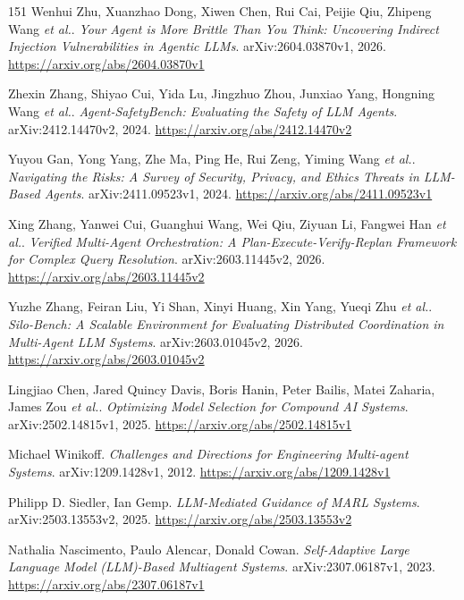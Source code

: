 \documentclass[11pt,a4paper]{article}
\begin{document}
\begin{thebibliography}{151}
Wenhui Zhu, Xuanzhao Dong, Xiwen Chen, Rui Cai, Peijie Qiu, Zhipeng Wang \emph{et al.}.
\newblock \emph{Your Agent is More Brittle Than You Think: Uncovering Indirect Injection Vulnerabilities in Agentic LLMs}.
\newblock arXiv:2604.03870v1, 2026.
\newblock \url{https://arxiv.org/abs/2604.03870v1}

Zhexin Zhang, Shiyao Cui, Yida Lu, Jingzhuo Zhou, Junxiao Yang, Hongning Wang \emph{et al.}.
\newblock \emph{Agent-SafetyBench: Evaluating the Safety of LLM Agents}.
\newblock arXiv:2412.14470v2, 2024.
\newblock \url{https://arxiv.org/abs/2412.14470v2}

Yuyou Gan, Yong Yang, Zhe Ma, Ping He, Rui Zeng, Yiming Wang \emph{et al.}.
\newblock \emph{Navigating the Risks: A Survey of Security, Privacy, and Ethics Threats in LLM-Based Agents}.
\newblock arXiv:2411.09523v1, 2024.
\newblock \url{https://arxiv.org/abs/2411.09523v1}

Xing Zhang, Yanwei Cui, Guanghui Wang, Wei Qiu, Ziyuan Li, Fangwei Han \emph{et al.}.
\newblock \emph{Verified Multi-Agent Orchestration: A Plan-Execute-Verify-Replan Framework for Complex Query Resolution}.
\newblock arXiv:2603.11445v2, 2026.
\newblock \url{https://arxiv.org/abs/2603.11445v2}

Yuzhe Zhang, Feiran Liu, Yi Shan, Xinyi Huang, Xin Yang, Yueqi Zhu \emph{et al.}.
\newblock \emph{Silo-Bench: A Scalable Environment for Evaluating Distributed Coordination in Multi-Agent LLM Systems}.
\newblock arXiv:2603.01045v2, 2026.
\newblock \url{https://arxiv.org/abs/2603.01045v2}

Lingjiao Chen, Jared Quincy Davis, Boris Hanin, Peter Bailis, Matei Zaharia, James Zou \emph{et al.}.
\newblock \emph{Optimizing Model Selection for Compound AI Systems}.
\newblock arXiv:2502.14815v1, 2025.
\newblock \url{https://arxiv.org/abs/2502.14815v1}

Michael Winikoff.
\newblock \emph{Challenges and Directions for Engineering Multi-agent Systems}.
\newblock arXiv:1209.1428v1, 2012.
\newblock \url{https://arxiv.org/abs/1209.1428v1}

Philipp D. Siedler, Ian Gemp.
\newblock \emph{LLM-Mediated Guidance of MARL Systems}.
\newblock arXiv:2503.13553v2, 2025.
\newblock \url{https://arxiv.org/abs/2503.13553v2}

Nathalia Nascimento, Paulo Alencar, Donald Cowan.
\newblock \emph{Self-Adaptive Large Language Model (LLM)-Based Multiagent Systems}.
\newblock arXiv:2307.06187v1, 2023.
\newblock \url{https://arxiv.org/abs/2307.06187v1}


\end{thebibliography}
\end{document}

